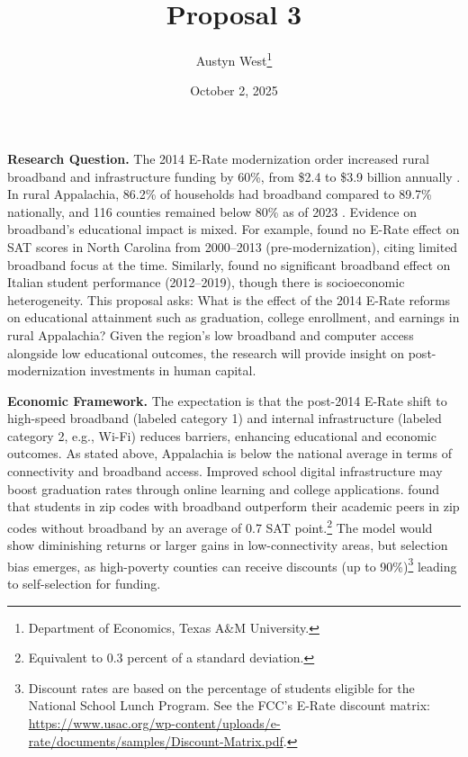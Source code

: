 


\begin{singlespace}
\title{Proposal 3}
\author{Austyn West\thanks{Department of Economics, Texas A\&M University.}}
\date{October 2, 2025}
\maketitle
\end{singlespace}

\textbf{Research Question.}  The 2014 E-Rate modernization order increased rural broadband and infrastructure funding by 60\%, from \$2.4 to \$3.9 billion annually \citep{federalcommunicationscommisionSummarySecondERate}. In rural Appalachia, 86.2\% of households had broadband compared to 89.7\% nationally, and 116 counties remained below 80\% as of 2023 \citep{srygleyAPPALACHIANREGIONDATA}. Evidence on broadband’s educational impact is mixed. For example, \cite{hazlettEducationalImpactBroadband2019} found no E-Rate effect on SAT scores in North Carolina from 2000–2013 (pre-modernization), citing limited broadband focus at the time. Similarly, \cite{boeriHighSpeedBroadbandSchool2023} found no significant broadband effect on Italian student performance (2012–2019), though there is socioeconomic heterogeneity. This proposal asks: What is the effect of the 2014 E-Rate reforms on educational attainment such as graduation, college enrollment, and earnings in rural Appalachia? Given the region’s low broadband and computer access alongside low educational outcomes, the research will provide insight on post-modernization investments in human capital.

\textbf{Economic Framework.} The expectation is that the post-2014 E-Rate shift to high-speed broadband (labeled category 1) and internal infrastructure (labeled category 2, e.g., Wi-Fi) reduces barriers, enhancing educational and economic outcomes. As stated above, Appalachia is below the national average in terms of connectivity and broadband access. Improved school digital infrastructure may boost graduation rates through online learning and college applications. \cite{dettlingEveryLittleBit2015} found that students in zip codes with broadband outperform their academic peers in zip codes without broadband by an average of 0.7 SAT point.\footnote{Equivalent to 0.3 percent of a standard deviation.} The model would show diminishing returns or larger gains in low-connectivity areas, but selection bias emerges, as high-poverty counties can receive discounts (up to 90\%)\footnote{Discount rates are based on the percentage of students eligible for the National School Lunch Program. See the FCC’s E-Rate discount matrix: \url{https://www.usac.org/wp-content/uploads/e-rate/documents/samples/Discount-Matrix.pdf}.} leading to self-selection for funding.  

